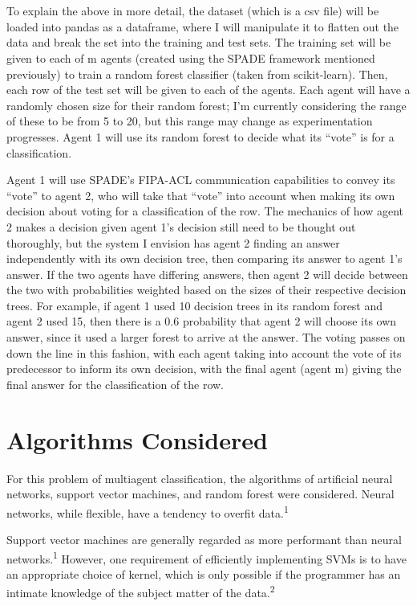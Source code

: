 \documentclass{article}
\begin{document}
\\ \\
To explain the above in more detail, the dataset (which is a csv file) will be loaded into pandas as a dataframe, where I will manipulate it to flatten out the data and break the set into the training and test sets. 
The training set will be given to each of m agents (created using the SPADE framework mentioned previously) to train a random forest classifier (taken from scikit-learn). 
Then, each row of the test set will be given to each of the agents. 
Each agent will have a randomly chosen size for their random forest; I'm currently considering the range of these to be from 5 to 20, but this range may change as experimentation progresses.
Agent 1 will use its random forest to decide what its ``vote'' is for a classification. 

Agent 1 will use SPADE's FIPA-ACL communication capabilities to convey its ``vote'' to agent 2, who will take that ``vote'' into account when making its own decision about voting for a classification of the row. 
The mechanics of how agent 2 makes a decision given agent 1's decision still need to be thought out thoroughly, but the system I envision has agent 2 finding an answer independently with its own decision tree, then comparing its answer to agent 1's answer.
If the two agents have differing answers, then agent 2 will decide between the two with probabilities weighted based on the sizes of their respective decision trees. 
For example, if agent 1 used 10 decision trees in its random forest and agent 2 used 15, then there is a 0.6 probability that agent 2 will choose its own answer, since it used a larger forest to arrive at the answer.
The voting passes on down the line in this fashion, with each agent taking into account the vote of its predecessor to inform its own decision, with the final agent (agent m) giving the final answer for the classification of the row.
\section{Algorithms Considered}
For this problem of multiagent classification, the algorithms of artificial neural networks, support vector machines, and random forest were considered. Neural networks, while flexible, have a tendency to overfit data.\textsuperscript{1}

Support vector machines are generally regarded as more performant than neural networks.\textsuperscript{1}
However, one requirement of efficiently implementing SVMs is to have an appropriate choice of kernel, which is only possible if the programmer has an intimate knowledge of the subject matter of the data.\textsuperscript{2}
\end{document}
